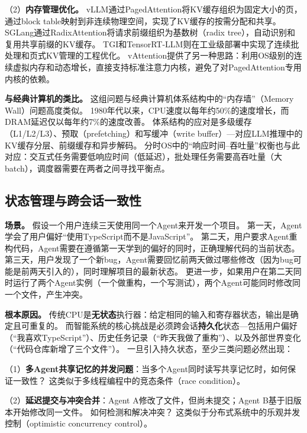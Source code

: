 （2）\textbf{内存管理优化。}
vLLM\cite{kwon2023pagedattention,vllm_docs_2026}通过PagedAttention将KV缓存组织为固定大小的页，通过block table映射到非连续物理空间，实现了KV缓存的按需分配和共享。
SGLang\cite{sglang2024,sglang_docs_2026}通过RadixAttention将请求前缀组织为基数树（radix tree），自动识别和复用共享前缀的KV缓存。
TGI\cite{tgi_docs_2026}和TensorRT-LLM\cite{tensorrtllm_docs_2026}则在工业级部署中实现了连续批处理和页式KV管理的工程优化。
vAttention\cite{prabhu2024vattention}提供了另一种思路：利用OS级别的连续虚拟内存和动态增长，直接支持标准注意力内核，避免了对PagedAttention专用内核的依赖。

\textbf{与经典计算机的类比。}
这组问题与经典计算机体系结构中的``内存墙''（Memory Wall）问题高度类似。
1980年代以来，CPU速度以每年约50\%的速度增长，而DRAM延迟仅以每年约7\%的速度改善\cite{hennessy2017quantitative}。
体系结构的应对是多级缓存（L1/L2/L3）、预取（prefetching）和写缓冲（write buffer）---对应LLM推理中的KV缓存分层、前缀缓存和异步解码。
分时OS中的``响应时间--吞吐量''权衡也与此对应：交互式任务需要低响应时间（低延迟），批处理任务需要高吞吐量（大batch），调度器需要在两者之间寻找平衡点\cite{ostep_2023}。

\subsection{状态管理与跨会话一致性}

\textbf{场景。}
假设一个用户连续三天使用同一个Agent来开发一个项目。
第一天，Agent学会了用户偏好``使用TypeScript而不是JavaScript''。
第二天，用户要求Agent重构代码，Agent需要在遵循第一天学到的偏好的同时，正确理解代码的当前状态。
第三天，用户发现了一个新bug，Agent需要回忆前两天做过哪些修改（因为bug可能是前两天引入的），同时理解项目的最新状态。
更进一步，如果用户在第二天同时运行了两个Agent实例（一个做重构，一个写测试），两个Agent可能同时修改同一个文件，产生冲突。

\textbf{根本原因。}
传统CPU是\textbf{无状态}执行器：给定相同的输入和寄存器状态，输出是确定且可重复的。
而智能系统的核心挑战是必须跨会话\textbf{持久化}状态---包括用户偏好（``我喜欢TypeScript''）、历史任务记录（``昨天我做了重构''）、以及外部世界变化（``代码仓库新增了三个文件''）。
一旦引入持久状态，至少三类问题必然出现：

（1）\textbf{多Agent共享记忆的并发问题}：当多个Agent同时读写共享记忆时，如何保证一致性？
这类似于多线程编程中的竞态条件（race condition）。

（2）\textbf{延迟提交与冲突合并}：Agent A修改了文件，但尚未提交；Agent B基于旧版本开始修改同一文件。
如何检测和解决冲突？
这类似于分布式系统中的乐观并发控制（optimistic concurrency control）。

